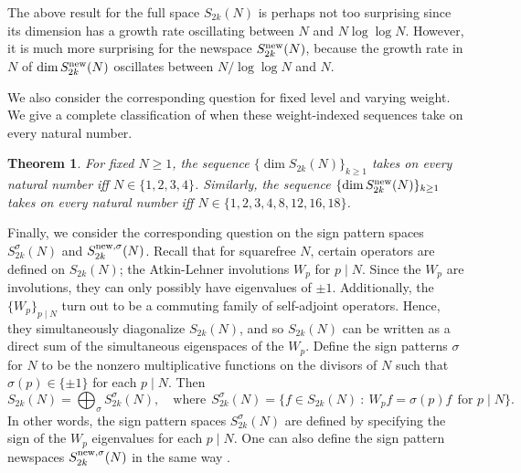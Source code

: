 \documentclass[12pt,letterpaper,reqno]{amsart}
\newtheorem{theorem}{Theorem}[section]
\theoremstyle{definition}
\numberwithin{equation}{section}
\numberwithin{figure}{section}
\numberwithin{table}{section}
\newcommand{\nw}{{\textnormal{new}}}
\begin{document}
The above result for the full space $S_{2k}(N)$ is perhaps not too surprising since its dimension has a growth rate oscillating between $N$ and $N \log \log N$. However, it is much more surprising for the newspace $S_{2k}^\nw(N)$, because the growth rate in $N$ of $\dim S_{2k}^\nw(N)$ oscillates between $N / \log \log N$ and $N$. 


We also consider the corresponding question for fixed level and varying weight. We give a complete classification of when these weight-indexed sequences take on every natural number.

\begin{theorem} \label{thm:k-indexed}
    For fixed $N \ge 1$, the sequence $\{ \dim S_{2k}(N) \}_{k\ge1}$ takes on every natural number 
    iff $N \in \{1,2,3,4\}$.
    Similarly, the sequence $\{ \dim S_{2k}^\nw(N) \}_{k\ge1}$ 
    takes on every natural number iff $N \in \{1,2,3,4,8,12,16,18\}$.
\end{theorem}

Finally, we consider the corresponding question on the sign pattern spaces $S_{2k}^\sigma(N)$ and $S_{2k}^{\nw,\sigma}(N)$. 
Recall that for squarefree $N$, certain operators are defined on $S_{2k}(N)$; the Atkin-Lehner involutions $W_p$ for $p \mid N$. Since the $W_p$ are involutions, they can only possibly have eigenvalues of $\pm 1$. Additionally, the $\{W_p\}_{p \mid N}$ turn out to be a commuting family of self-adjoint operators. Hence, they simultaneously diagonalize $S_{2k}(N)$, and so $S_{2k}(N)$ can be written as a direct sum of the simultaneous eigenspaces of the $W_p$. Define the sign patterns $\sigma$ for $N$ to be the nonzero multiplicative functions on the divisors of $N$ such that $\sigma(p) \in \{\pm 1\}$ for each $p \mid N$.
Then
$$
S_{2k}(N) = \bigoplus_\sigma S_{2k}^\sigma(N), \quad \text{where} \ \ S_{2k}^\sigma(N) = \{f \in S_{2k}(N) \ \colon \ W_p f = \sigma(p) f \ \ \text{for } p \mid N \}.
$$
In other words, the sign pattern spaces $S_{2k}^\sigma(N)$ are defined by specifying the sign of the $W_p$ eigenvalues for each $p \mid N$.
One can also define the sign pattern newspaces $S_{2k}^{\nw,\sigma}(N)$ in the same way \cite[Section 3]{kimball}. 

\end{document}
